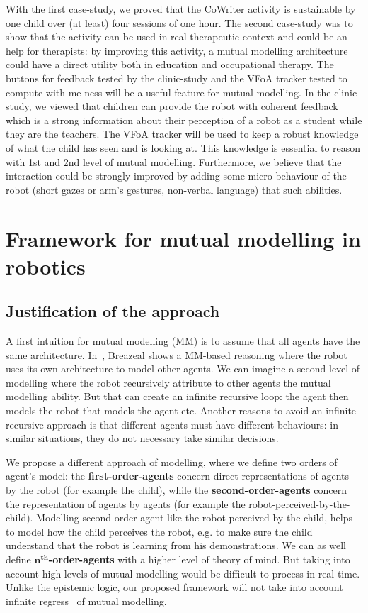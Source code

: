 \documentclass[10pt,a4paper]{article}
\begin{document}
With the first case-study, we proved that the CoWriter activity is sustainable by one child over (at least) four sessions of one hour. The second case-study was to show that the activity can be used in real therapeutic context and could be an help for therapists: by improving this activity, a mutual modelling architecture could have a direct utility both in education and occupational therapy. The buttons for feedback tested by the clinic-study and the VFoA tracker tested to compute with-me-ness will be a useful feature for mutual modelling. In the clinic-study, we viewed that children can provide the robot with coherent feedback which is a strong information about their perception of a robot as a student while they are the teachers. The VFoA tracker will be used to keep a robust knowledge of what the child has seen and is looking at. This knowledge is essential to reason with 1st and 2nd level of mutual modelling. Furthermore, we believe that the interaction could be strongly improved by adding some micro-behaviour of the robot (short gazes or arm's gestures, non-verbal language) that such abilities.

\section{Framework for mutual modelling in robotics}\label{framework}
\subsection{Justification of the approach}

A first intuition for mutual modelling (MM) is to assume that all agents have the same architecture. In~\cite{breazeal2006using}, Breazeal shows a MM-based reasoning where the robot uses its own architecture to model other agents. We can imagine a second level of modelling where the robot recursively attribute to other agents the mutual modelling ability. But that can create an infinite recursive loop: the agent then models the robot that models the agent etc. Another reasons to avoid an infinite recursive approach is that different agents must have different behaviours: in similar situations, they do not necessary take similar decisions. 

We propose a different approach of modelling, where we define two orders of agent's model: the \textbf{first-order-agents} concern direct representations of agents by the robot (for example the child), while the \textbf{second-order-agents} concern the representation of agents by agents (for example the robot-perceived-by-the-child). 
Modelling second-order-agent like the robot-perceived-by-the-child, helps to model how the child perceives the robot, e.g. to make sure the child understand that the robot is learning from his demonstrations. 
We can as well define $\textbf{n}^{\textbf{th}}$\textbf{-order-agents} with a higher level of theory of mind. But taking into account high levels of mutual modelling would be difficult to process in real time. Unlike the epistemic logic, our proposed framework will not take into account infinite regress~\cite{clark1991grounding} of mutual modelling.
\end{document}
